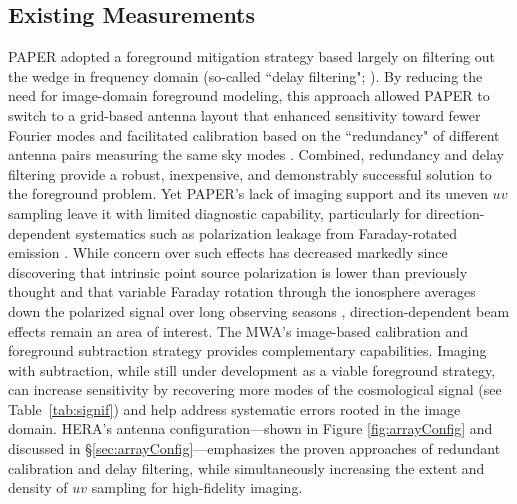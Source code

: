 \documentclass[preprint,11pt]{aastex}
\newcommand{\Mycitep}[1]{\citep{#1}}
\begin{document}
\subsection{Existing Measurements}
\label{sec:existing}
PAPER adopted a foreground mitigation strategy based largely
on filtering out the wedge in frequency domain (so-called ``delay filtering"; \citealt{parsons_et_al2012b}).  
By reducing the need
for image-domain foreground modeling, this approach allowed PAPER to switch to a grid-based antenna layout that
enhanced sensitivity toward fewer Fourier modes and facilitated calibration
based on the ``redundancy" of different antenna pairs measuring the same sky modes \citep{zheng_et_al2014}.
Combined, redundancy and delay filtering provide a robust, inexpensive, and demonstrably successful solution 
to the foreground problem.  
Yet PAPER's lack of imaging support and its uneven $uv$ sampling 
leave it with limited diagnostic capability, particularly for direction-dependent systematics
such as polarization leakage from Faraday-rotated emission \Mycitep{moore_et_al2013}.
While concern over such effects has decreased markedly since discovering that
intrinsic point source polarization is lower than previously thought
\citep{asad_et_al2015} and that variable Faraday rotation through the
ionosphere averages down the polarized signal over long observing seasons
\Mycitep{moore_et_al2016}, direction-dependent beam effects remain an area of interest.
The MWA's image-based calibration and foreground subtraction strategy provides complementary
capabilities. Imaging with subtraction, while still under development as a viable foreground strategy,
can increase sensitivity by recovering more modes of the cosmological signal (see
Table~\ref{tab:signif}) and help address systematic errors rooted
in the image domain.  HERA's antenna configuration---shown in Figure \ref{fig:arrayConfig} and discussed in \S\ref{sec:arrayConfig}---emphasizes
the proven approaches of redundant calibration and delay filtering, while simultaneously
increasing the extent and density of $uv$ sampling for high-fidelity imaging.  
\end{document}
